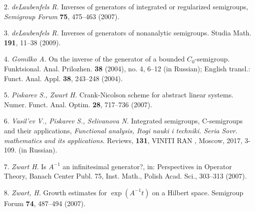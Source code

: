 2. {\it  deLaubenfels R.} Inverses of generators of integrated or regularized semigroups,
\emph{Semigroup Forum} \textbf{75}, 475--463  (2007).

3. {\it deLaubenfels R.} Inverses of generators of nonanalytic semigroups.
Studia Math. \textbf{191}, 11--38 (2009).

4. {\it Gomilko A.} On the inverse of the generator of a bounded $C_0$-semigroup.
Funktsional. Anal. Prilozhen. \textbf{38} (2004), no. 4, 6--12 (in Russian);
English transl.: Funct. Anal. Appl. \textbf{38}, 243--248 (2004).

5. {\it Piskarev S., Zwart H.} Crank-Nicolson scheme for abstract linear systems.
Numer. Funct. Anal. Optim. \textbf{28}, 717--736 (2007).

6. {\it  Vasil'ev V.,  Piskarev S.,  Selivanova N.}  Integrated semigroups, C-semigroups and their
applications, \emph{Functional analysis, Itogi nauki i techniki. Seria Sovr. mathematics and
its applications.} Reviews, \textbf{131}, VINITI RAN , Moscow, 2017, 3-109. (in Russian).

7. {\it  Zwart H.} Is $A^{-1}$ an infinitesimal generator?, in: Perspectives in Operator
Theory, Banach Center Publ. 75, Inst. Math., Polish Acad. Sci., 303--313 (2007).

8. { \it Zwart, H.} Growth estimates for $\exp(A^{-1}t)$ on a Hilbert space. Semigroup
Forum \textbf{74}, 487--494 (2007).

